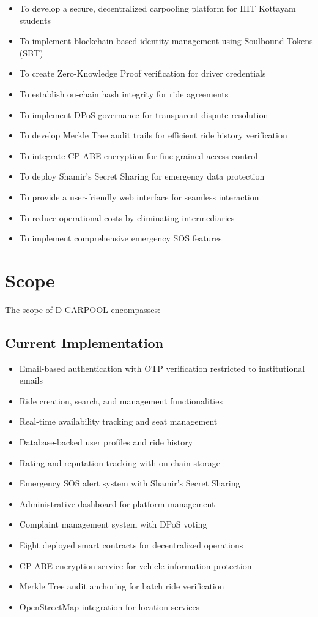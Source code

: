 \documentclass[12pt]{report}
\theoremstyle{plain}
\theoremstyle{definition}
\theoremstyle{remark}
\begin{document}
\begin{itemize}
    \item To develop a secure, decentralized carpooling platform for IIIT Kottayam students
    \item To implement blockchain-based identity management using Soulbound Tokens (SBT)
    \item To create Zero-Knowledge Proof verification for driver credentials
    \item To establish on-chain hash integrity for ride agreements
    \item To implement DPoS governance for transparent dispute resolution
    \item To develop Merkle Tree audit trails for efficient ride history verification
    \item To integrate CP-ABE encryption for fine-grained access control
    \item To deploy Shamir's Secret Sharing for emergency data protection
    \item To provide a user-friendly web interface for seamless interaction
    \item To reduce operational costs by eliminating intermediaries
    \item To implement comprehensive emergency SOS features
\end{itemize}

\section{Scope}

The scope of D-CARPOOL encompasses:

\subsection{Current Implementation}

\begin{itemize}
    \item Email-based authentication with OTP verification restricted to institutional emails
    \item Ride creation, search, and management functionalities
    \item Real-time availability tracking and seat management
    \item Database-backed user profiles and ride history
    \item Rating and reputation tracking with on-chain storage
    \item Emergency SOS alert system with Shamir's Secret Sharing
    \item Administrative dashboard for platform management
    \item Complaint management system with DPoS voting
    \item Eight deployed smart contracts for decentralized operations
    \item CP-ABE encryption service for vehicle information protection
    \item Merkle Tree audit anchoring for batch ride verification
    \item OpenStreetMap integration for location services
\end{itemize}
\end{document}
